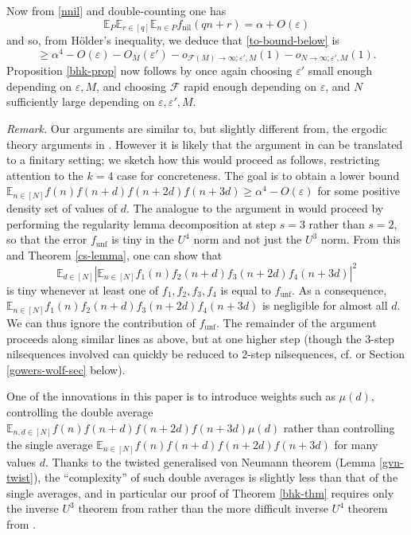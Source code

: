 \documentclass[11pt,reqno]{amsart}
\numberwithin{equation}{section}
\theoremstyle{plain}
\theoremstyle{definition}
\renewcommand{\geq}{\geqslant}
\newcommand\E{{\mathbb{E}}}
\newcommand\1{{\bf 1}}
\newcommand\2{{\bf 2}}
\newcommand\eps{\varepsilon}
\newcommand\nil{{\operatorname{nil}}}
\newcommand\unf{{\operatorname{unf}}}
\newcommand\Grow{{\mathcal F}}
\begin{document}
Now from \eqref{nnil} and double-counting one has
$$ \E_P \E_{r \in [q]} \E_{n \in P} f_\nil(qn+r) = \alpha + O(\eps)$$ and so, from H\"older's inequality, we deduce that \eqref{to-bound-below} is 
\[ \geq \alpha^4 - O(\eps) - O_M(\eps') - o_{\Grow(M) \to \infty; \eps',M}(1) - o_{N \to \infty;\eps',M}(1).\]
Proposition \ref{bhk-prop} now follows by once again choosing $\eps'$ small enough depending on $\eps,M$, and choosing $\Grow$ rapid enough depending on $\eps$, and $N$ sufficiently large depending on $\eps,\eps',M$.

\emph{Remark.}  Our arguments are similar to, but slightly different from, the ergodic theory arguments in \cite{bergelson-host-kra}.  However it is likely that the argument in \cite{bergelson-host-kra} can be translated to a finitary setting; we sketch how this would proceed as follows, restricting attention to the $k=4$ case for concreteness.  The goal is to obtain a lower bound $\E_{n \in [N]} f(n) f(n+d) f(n+2d) f(n+3d) \geq \alpha^4 - O(\eps)$ for some positive density set of values of $d$.  The analogue to the argument in \cite{bergelson-host-kra} would proceed by performing the regularity lemma decomposition at step $s=3$ rather than $s=2$, so that the error $f_{\unf}$ is tiny in the $U^4$ norm and not just the $U^3$ norm.  From this and Theorem \ref{cs-lemma}, one can show that
$$ \E_{d \in [N]} |\E_{n \in [N]} f_1(n) f_2(n+d) f_3(n+2d) f_4(n+3d)|^2$$
is tiny whenever at least one of $f_1,f_2,f_3,f_4$ is equal to $f_{\unf}$.  As a consequence, $\E_{n \in [N]} f_1(n) f_2(n+d) f_3(n+2d) f_4(n+3d)$ is negligible for almost all $d$.  We can thus ignore the contribution of $f_{\unf}$.  The remainder of the argument proceeds along similar lines as above, but at one higher step (though the $3$-step nilsequences involved can quickly be reduced to $2$-step nilsequences, cf. \cite[Section 8.1]{bergelson-host-kra} or Section \ref{gowers-wolf-sec} below).

One of the innovations in this paper is to introduce weights such as $\mu(d)$, controlling the double average $\E_{n,d \in [N]} f(n) f(n+d) f(n+2d) f(n+3d) \mu(d)$ rather than controlling the single average $\E_{n \in [N]} f(n) f(n+d) f(n+2d) f(n+3d)$ for many values $d$.  Thanks to the twisted generalised von Neumann theorem (Lemma \ref{gvn-twist}), the ``complexity'' of such double averages is slightly less than that of the single averages, and in particular our proof of Theorem \ref{bhk-thm} requires only the inverse $U^3$ theorem from \cite{green-tao-u3inverse} rather than the more difficult inverse $U^4$ theorem from \cite{green-tao-ziegler-u4inverse}.
\end{document}

